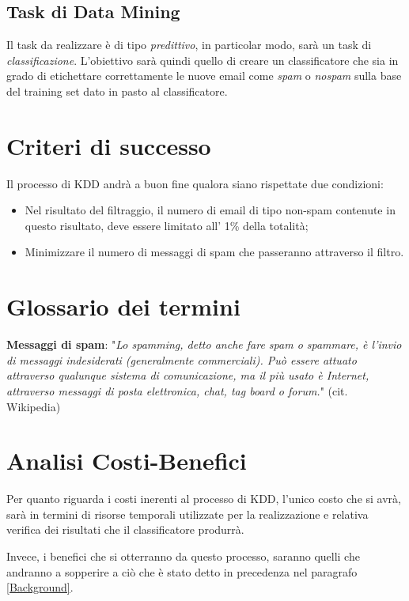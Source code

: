 \subsection{Task di Data Mining}
	Il task da realizzare è di tipo \textit{predittivo}, in particolar modo, sarà un task di \textit{classificazione}. L'obiettivo sarà quindi quello di creare un classificatore che sia in grado di etichettare correttamente le nuove email come \textit{spam} o \textit{nospam} sulla base del training set dato in pasto al classificatore. 

\section{Criteri di successo}
	Il processo di KDD andrà a buon fine qualora siano rispettate due condizioni:
	\begin{itemize}
		\item 	Nel risultato del filtraggio, il numero di email di tipo non-spam contenute in questo risultato, deve essere limitato 	all' 1\% della totalità;
		\item	Minimizzare il numero di messaggi di spam che passeranno attraverso il filtro.
	\end{itemize}

\section{Glossario dei termini}
\textbf{Messaggi di spam}: "\textit{Lo spamming, detto anche fare spam o spammare, è l'invio di messaggi indesiderati (generalmente commerciali). Può essere attuato attraverso qualunque sistema di comunicazione, ma il più usato è Internet, attraverso messaggi di posta elettronica, chat, tag board o forum.}" (cit. Wikipedia)\cite{wiki:Spam}

\section{Analisi Costi-Benefici}
Per quanto riguarda i costi inerenti al processo di KDD, l'unico costo che si avrà, sarà in termini di risorse temporali utilizzate per la realizzazione e relativa verifica dei risultati che il classificatore produrrà.

Invece, i benefici che si otterranno da questo processo, saranno quelli che andranno a sopperire a ciò che è stato detto in precedenza nel paragrafo \ref{Background}.


